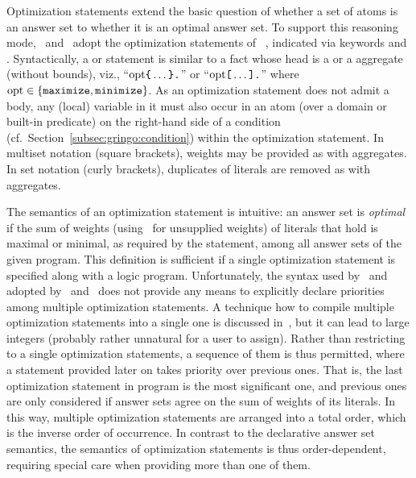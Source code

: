 Optimization statements extend the basic question of
whether a set of atoms is an answer set to
whether it is an optimal answer set.
To support this reasoning mode, \gringo\ and \clingo\ adopt the
optimization statements of \lparse~\cite{lparseManual},
indicated via keywords  and .
Syntactically, a  or  statement
is similar to a fact whose head is a  or a 
aggregate (without bounds),
viz.,
``$\textrm{opt}\code{\char`\{}\dots\code{\char`\}}\code{.}$'' or
``$\textrm{opt}\texttt{[}\dots\texttt{]}\texttt{.}$'' where
$\textrm{opt}\in\{\const{maximize},\linebreak[1]\const{minimize}\}$.
As an optimization statement does not admit a body, any (local) variable
in it must also occur in an atom (over a domain or built-in predicate)
on the right-hand side of a condition (cf.\ Section~\ref{subsec:gringo:condition})
within the optimization statement.
In multiset notation (square brackets),
weights may be provided as with  aggregates. %
In set notation (curly brackets),
duplicates of literals are removed
as with  aggregates.

The semantics of an optimization statement is intuitive:
an answer set is \emph{optimal} if the sum of weights
(using~ for unsupplied weights)
of literals that hold is maximal or minimal, as required by the statement,
among all answer sets of the given program.
This definition is sufficient if a single optimization statement is specified
along with a logic program.
Unfortunately, the syntax used by \lparse\ and adopted by \gringo\ and \clingo\
does not provide any means to explicitly declare priorities among multiple
optimization statements.
A technique how to compile multiple optimization statements into a single one
is discussed in~\cite{siniso02a},
but it can lead to large integers
(probably rather unnatural for a user to assign).
Rather than restricting to a single optimization statements,
a sequence of them is thus permitted,
where a statement provided later on takes priority over previous ones.
That is, the last optimization statement in program is the most significant one,
and previous ones are only considered if answer sets agree on the sum of 
weights of its literals.
In this way, multiple optimization statements are arranged into a total order,
which is the inverse order of occurrence.
In contrast to the declarative answer set semantics, the semantics of
optimization statements is thus order-dependent,
requiring special care when providing more than one of them.

